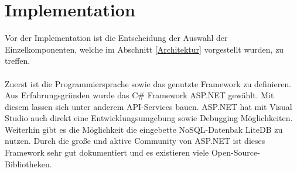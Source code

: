 \section{Implementation} \label{sec:Implementation}
Vor der Implementation ist die Entscheidung der Auswahl der Einzelkomponenten, welche im Abschnitt \ref{Architektur} vorgestellt wurden, zu treffen.
\\ \\
Zuerst ist die Programmiersprache sowie das genutzte Framework zu definieren.
Aus Erfahrungsgründen wurde das C\# Framework ASP.NET gewählt.
Mit diesem lassen sich unter anderem API-Services bauen.
ASP.NET hat mit Visual Studio auch direkt eine Entwicklungsumgebung sowie Debugging Möglichkeiten.
Weiterhin gibt es die Möglichkeit die eingebette NoSQL-Datenbak LiteDB zu nutzen.
Durch die große und aktive Community von ASP.NET ist dieses Framework sehr gut dokumentiert und es existieren viele Open-Source-Bibliotheken.
